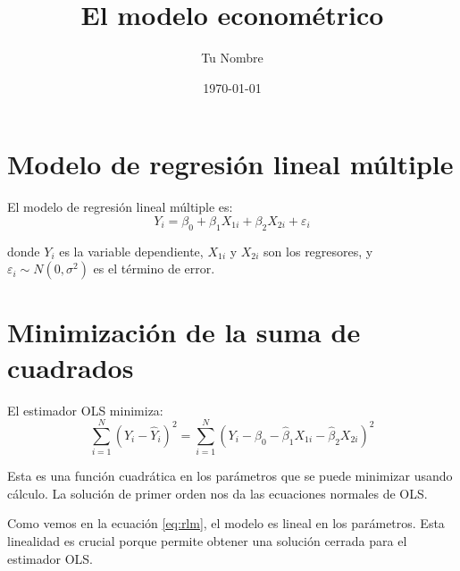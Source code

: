 \documentclass[12pt, a4paper]{article}
\title{El modelo econométrico}
\author{Tu Nombre}
\date{\today}
\begin{document}
\maketitle

\section{Modelo de regresión lineal múltiple}

El modelo de regresión lineal múltiple es:
\begin{equation}
  Y_i = \beta_0 + \beta_1 X_{1i} + \beta_2 X_{2i} + \varepsilon_i
  \label{eq:rlm}
\end{equation}

donde $Y_i$ es la variable dependiente, $X_{1i}$ y $X_{2i}$ son los regresores, 
y $\varepsilon_i \sim N(0, \sigma^2)$ es el término de error.

\section{Minimización de la suma de cuadrados}

El estimador OLS minimiza:
\[
  \sum_{i=1}^{N} (Y_i - \hat{Y}_i)^2
    = \sum_{i=1}^{N} (Y_i - \hat{\beta}_0
      - \hat{\beta}_1 X_{1i} - \hat{\beta}_2 X_{2i})^2
\]

Esta es una función cuadrática en los parámetros que se puede minimizar 
usando cálculo. La solución de primer orden nos da las ecuaciones normales 
de OLS.

Como vemos en la ecuación \eqref{eq:rlm}, el modelo es lineal en los 
parámetros. Esta linealidad es crucial porque permite obtener una solución 
cerrada para el estimador OLS.
\end{document}
